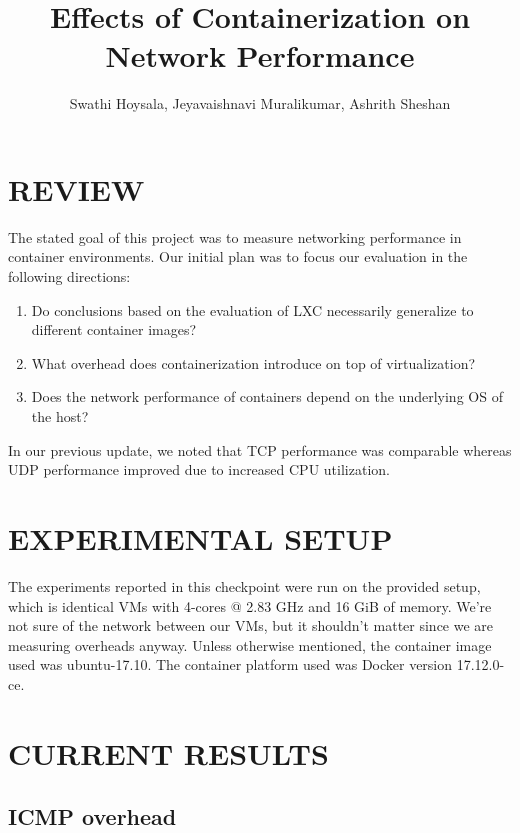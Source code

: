 \documentclass[letterpaper, 10 pt, conference]{ieeeconf}  %
\title{\LARGE \bf
Effects of Containerization on Network Performance
}
\author{Swathi Hoysala, Jeyavaishnavi Muralikumar, Ashrith Sheshan %
}
\begin{document}
\maketitle
\thispagestyle{empty}
\pagestyle{empty}




\section{REVIEW}

The stated goal of this project was to measure networking performance in container environments. Our initial plan was to focus our evaluation in the following directions:

\begin{enumerate}
	\item Do conclusions based on the evaluation of LXC \cite{zhao2017performance} necessarily generalize to different container images?
    \item What overhead does containerization introduce on top of virtualization?
    \item Does the network performance of containers depend on the underlying OS of the host?
\end{enumerate}

In our previous update, we noted that TCP performance was comparable whereas UDP performance improved due to increased CPU utilization. 

\section{EXPERIMENTAL SETUP}

The experiments reported in this checkpoint were run on the provided setup, which is identical VMs with 4-cores @ 2.83 GHz and 16 GiB of memory. We're not sure of the network between our VMs, but it shouldn't matter since we are measuring overheads anyway. Unless otherwise mentioned, the container image used was ubuntu-17.10. The container platform used was Docker version 17.12.0-ce.

\section{CURRENT RESULTS}

\subsection{ICMP overhead}
\end{document}
